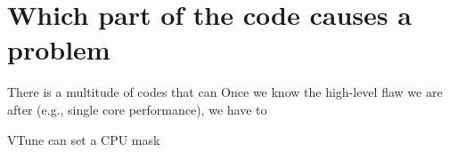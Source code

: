 \section{Which part of the code causes a problem} 
\label{section:localisation:which}

There is a multitude of codes that can 
Once we know the high-level flaw we are after (e.g., single core performance),
we have to 





VTune can set a CPU mask